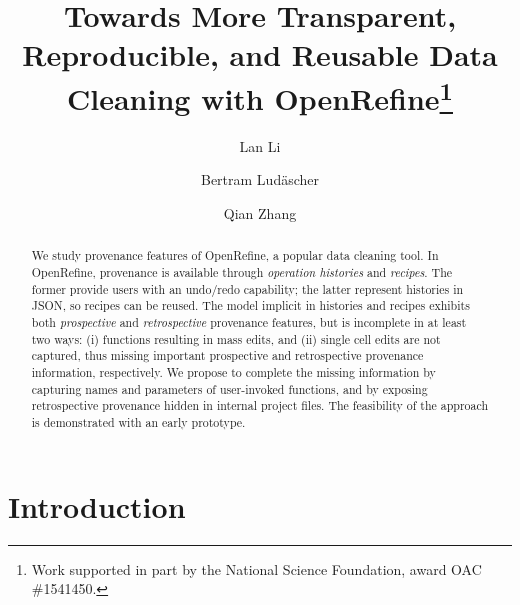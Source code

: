 \documentclass[runningheads]{llncs}
\begin{document}
\newcommand{\ywa}[1]{\textsf{#1}}

%
\title{Towards More Transparent, Reproducible, and Reusable Data Cleaning with OpenRefine\thanks{Work supported in part by the National Science Foundation, award OAC \#1541450.}}
%
%
\author{Lan Li \and
Bertram Lud\"ascher \and
Qian Zhang 
}
%
%

\maketitle              %

\begin{abstract}
  We study provenance features of OpenRefine, a popular data cleaning tool. In OpenRefine,
  provenance is available through \emph{operation histories} and \emph{recipes}. The former provide
  users with an undo/redo capability; the latter represent histories in JSON, so recipes can be
  reused. The model implicit in histories and recipes exhibits both \emph{prospective} and
  \emph{retrospective} provenance features, but is incomplete in at least two ways: (i) functions
  resulting in mass edits, and (ii) single cell edits are not captured, thus missing important
  prospective and retrospective provenance information, respectively. We propose to complete the
  missing information by capturing names and parameters of user-invoked functions, and by exposing
  retrospective provenance hidden in internal project files. The feasibility of the approach is
  demonstrated with an early prototype.   \end{abstract}

\section{Introduction}
\end{document}
